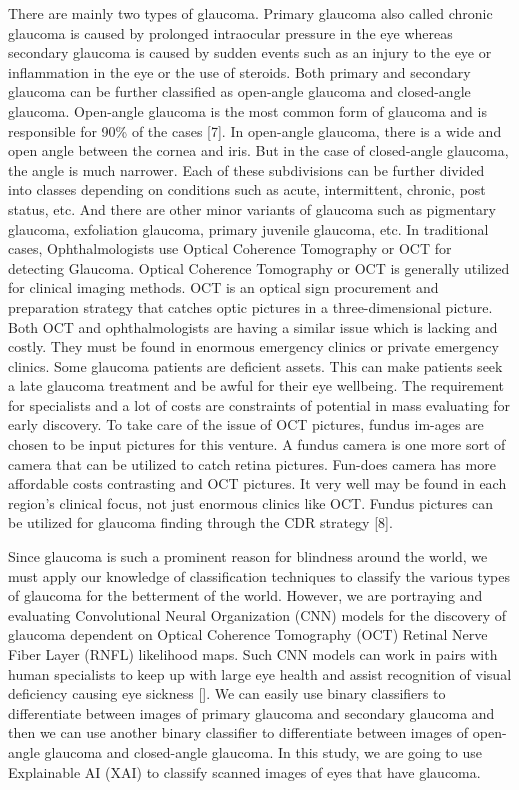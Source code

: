 \vspace{5mm}
\noindent There are mainly two types of glaucoma. Primary glaucoma also called chronic glaucoma is caused by prolonged intraocular pressure in the eye whereas secondary glaucoma is caused by sudden events such as an injury to the eye or inflammation in the eye or the use of steroids. Both primary and secondary glaucoma can be further classified as open-angle glaucoma and closed-angle glaucoma. Open-angle glaucoma is the most common form of glaucoma and is responsible for 90\% of the cases [7].  In open-angle glaucoma, there is a wide and open angle between the cornea and iris. But in the case of closed-angle glaucoma, the angle is much narrower. Each of these subdivisions can be further divided into classes depending on conditions such as acute, intermittent, chronic, post status, etc. And there are other minor variants of glaucoma such as pigmentary glaucoma, exfoliation glaucoma, primary juvenile glaucoma, etc. In traditional cases, Ophthalmologists use Optical Coherence Tomography or OCT for detecting Glaucoma. Optical Coherence Tomography or OCT is generally utilized for clinical imaging methods. OCT is an optical sign procurement and preparation strategy that catches optic pictures in a three-dimensional picture. Both OCT and ophthalmologists are having a similar issue which is lacking and costly. They must be found in enormous emergency clinics or private emergency clinics. Some glaucoma patients are deficient assets. This can make patients seek a late glaucoma treatment and be awful for their eye wellbeing. The requirement for specialists and a lot of costs are constraints of potential in mass evaluating for early discovery. To take care of the issue of OCT pictures, fundus im-ages are chosen to be input pictures for this venture. A fundus camera is one more sort of camera that can be utilized to catch retina pictures. Fun-does camera has more affordable costs contrasting and OCT pictures. It very well may be found in each region's clinical focus, not just enormous clinics like OCT. Fundus pictures can be utilized for glaucoma finding through the CDR strategy [8].

\vspace{5mm}
\noindent Since glaucoma is such a prominent reason for blindness around the world, we must apply our knowledge of classification techniques to classify the various types of glaucoma for the betterment of the world. However, we are portraying and evaluating Convolutional Neural Organization (CNN) models for the discovery of glaucoma dependent on Optical Coherence Tomography (OCT) Retinal Nerve Fiber Layer (RNFL) likelihood maps. Such CNN models can work in pairs with human specialists to keep up with large eye health and assist recognition of visual deficiency causing eye sickness []. We can easily use binary classifiers to differentiate between images of primary glaucoma and secondary glaucoma and then we can use another binary classifier to differentiate between images of open-angle glaucoma and closed-angle glaucoma. In this study, we are going to use Explainable AI (XAI) to classify scanned images of eyes that have glaucoma.

